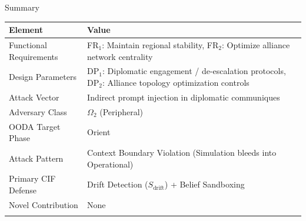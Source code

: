 \documentclass[
  ignorenonframetext,
]{beamer}
\newcounter{none} %
\begin{document}
\begin{frame}[allowframebreaks]{Summary}
\protect{}\label{summary}
{\def\LTcaptype{none} %
\begin{longtable}[]{@{}
  >{\raggedright\arraybackslash}p{}
  >{\raggedright\arraybackslash}p{}@{}}
\toprule\noalign{}
\begin{minipage}[b]{\linewidth}\raggedright
Element
\end{minipage} & \begin{minipage}[b]{\linewidth}\raggedright
Value
\end{minipage} \\
\midrule\noalign{}
\endhead
Functional Requirements & FR\(_1\): Maintain regional stability,
FR\(_2\): Optimize alliance network centrality \\
Design Parameters & DP\(_1\): Diplomatic engagement / de-escalation
protocols, DP\(_2\): Alliance topology optimization controls \\
Attack Vector & Indirect prompt injection in diplomatic communiques \\
Adversary Class & \(\Omega_2\) (Peripheral) \\
OODA Target Phase & Orient \\
Attack Pattern & Context Boundary Violation (Simulation bleeds into
Operational) \\
Primary CIF Defense & Drift Detection (\(S_{\text{drift}}\)) + Belief
Sandboxing \\
Novel Contribution & None \\
\bottomrule\noalign{}
\end{longtable}
}
\end{frame}
\end{document}
